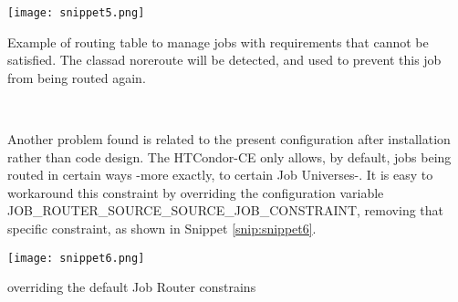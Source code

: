 \documentclass[a4paper]{jpconf}
\begin{document}
\begin{snippet}[h]
    \centering
    \renewcommand\figurename{Snippet}
    \texttt{[image: snippet5.png]}
    \caption{Example of routing table to manage jobs with requirements that cannot be satisfied. The classad noreroute will be detected, and used to prevent this job from being routed again.}
    \label{snip:snippet5}
\end{snippet}


~

Another problem found is related to the present configuration after installation rather than code design. 
The HTCondor-CE only allows, by default, jobs being routed in certain ways -more exactly, to certain Job Universes-.
It is easy to workaround this constraint by overriding the configuration
variable JOB\_ROUTER\_SOURCE\_SOURCE\_JOB\_CONSTRAINT, 
removing that specific constraint, as shown in Snippet \ref{snip:snippet6}.

\begin{snippet}[h]
    \centering
    \renewcommand\figurename{Snippet}
    \texttt{[image: snippet6.png]}
    \caption{overriding the default Job Router constrains}
    \label{snip:snippet6}
\end{snippet}
\end{document}
